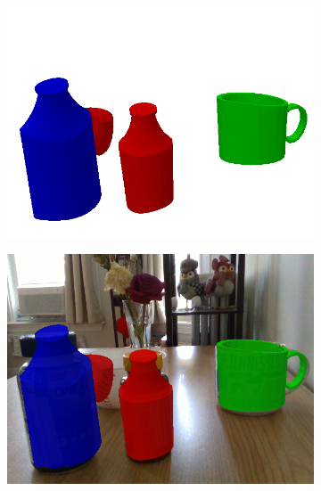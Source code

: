 \documentclass{article}
\begin{document}
\begin{figure}[]
\begin{subfigure}{(\linewidth - 0.05\linewidth)/5}
        \includegraphics[width=\linewidth]{figures/real2sim2real/7/3_sim.png}
    \end{subfigure}
    \begin{subfigure}{(\linewidth - 0.05\linewidth)/5}
        \centering
        \includegraphics[width=\linewidth]{figures/real2sim2real/7/3.png}
    \end{subfigure}
    \begin{subfigure}{(\linewidth - 0.05\linewidth)/5}
        \centering

\end{subfigure}
\end{figure}
\end{document}
